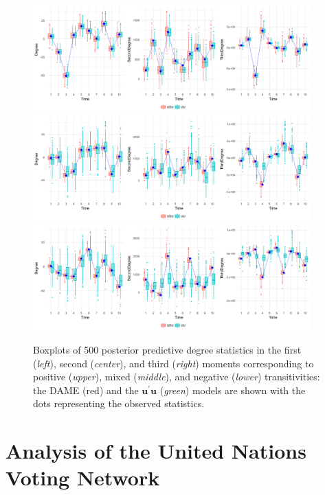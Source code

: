 \documentclass[a4paper]{article}
\begin{document}
\begin{figure}[!ht]
	\centering
			\includegraphics[width=0.955\textwidth]{plots_paper/newpositiveD-1.png}	
		\includegraphics[width=0.955\textwidth]{plots_paper/newmixedD-1.png}	
						\includegraphics[width=0.955\textwidth]{plots_paper/newnegativeD-1.png}	
	\caption {Boxplots of 500 posterior predictive degree statistics in the first (\textit{left}), second (\textit{center}), and third (\textit{right}) moments corresponding to positive (\textit{upper}), mixed (\textit{middle}), and negative (\textit{lower}) transitivities: the DAME (red) and the $\boldsymbol{u}^\prime \boldsymbol{u}$ (\textit{green}) models are shown with the dots representing the observed statistics.}
	\label{figure:negativitystudy}
\end{figure}

\section{Analysis of the United Nations Voting Network}\label{sec: UNvoting}
\end{document}
